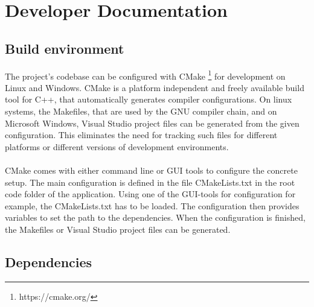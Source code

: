 \section{Developer Documentation}\label{sec:devdoc}


\subsection{Build environment}

The project’s codebase can be configured with CMake \footnote{https://cmake.org/} for development on Linux and Windows. CMake is a platform independent and freely available build tool for C++, that automatically generates compiler configurations. On linux systems, the Makefiles, that are used by the GNU compiler chain, and on Microsoft Windows, Visual Studio project files can be generated from the given configuration. This eliminates the need for tracking such files for different platforms or different versions of development environments.
\\
\\
CMake comes with either command line or GUI tools to configure the concrete setup. The main configuration is defined in the file CMakeLists.txt in the root code folder of the application. Using one of the GUI-tools for configuration for example, the CMakeLists.txt has to be loaded. The configuration then provides variables to set the path to the dependencies. When the configuration is finished, the Makefiles or Visual Studio project files can be generated.


\subsection{Dependencies}

